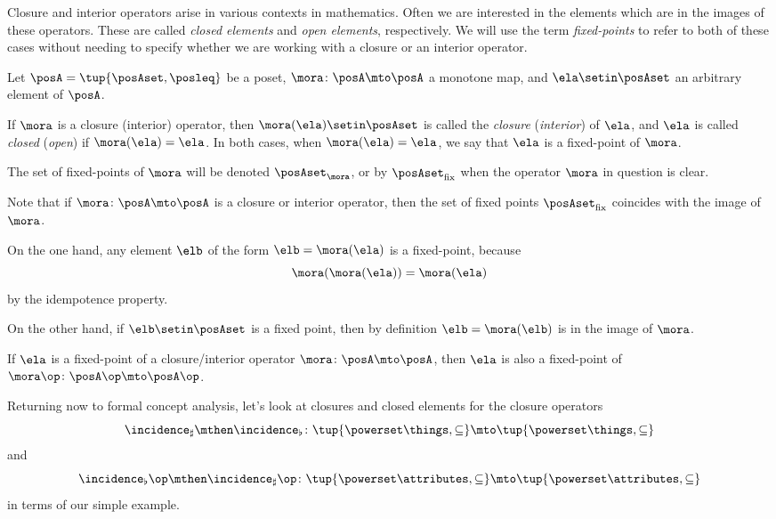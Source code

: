 Closure and interior operators arise in various contexts in mathematics.
Often we are interested in the elements which are in the images of these operators.
These are called \emph{closed elements} and \emph{open elements}, respectively.
We will use the term \emph{fixed-points} to refer to both of these cases without needing to specify whether we are working with a closure or an interior operator.

\begin{definition}\label{def:closure-closed-elements}
    Let $\posA = \tup{\posAset, \posleq}$ be a poset, $\mora \colon \posA \mto \posA$ a monotone map, and $\ela \setin \posAset$ an arbitrary element of $\posA$.

    If $\mora$ is a closure (interior) operator, then $\mora(\ela) \setin \posAset$ is called the \emph{closure} (\emph{interior}) of $\ela$, and $\ela$ is called \emph{closed} (\emph{open}) if $\mora(\ela) = \ela$.
    In both cases, when $\mora(\ela) = \ela$, we say that $\ela$ is a fixed-point of $\mora$.

    The set of fixed-points of $\mora$ will be denoted $\posAset_\mora$, or by $\posAset_{\text{fix}}$ when the operator $\mora$ in question is clear.
\end{definition}

\begin{remark}\label{rem:closed-elements-are-image}
    Note that if $\mora \colon \posA \mto \posA$ is a closure or interior operator, then the set of fixed points $\posAset_{\text{fix}}$ coincides with the image of $\mora$.

    On the one hand, any element $\elb$ of the form $\elb = \mora(\ela)$ is a fixed-point, because
    \begin{equation}
        \mora(\mora(\ela)) = \mora(\ela)
    \end{equation}
    by the idempotence property.

    On the other hand, if $\elb \setin \posAset$ is a fixed point, then by definition $\elb = \mora(\elb)$ is in the image of $\mora$.
\end{remark}

\begin{remark}\label{rem:fixed-points-coincide-closure-or-interior}
    If $\ela$ is a fixed-point of a closure/interior operator $\mora \colon \posA \mto \posA$, then $\ela$ is also a fixed-point of $\mora\op \colon \posA\op \mto \posA\op$.
\end{remark}

Returning now to formal concept analysis, let's look at closures and closed elements for the closure operators
$$\incidence_\sharp \mthen \incidence_\flat \colon \tup{\powerset \things, \subseteq} \mto \tup{\powerset \things, \subseteq}$$
and
$$\incidence_\flat\op \mthen \incidence_\sharp\op \colon \tup{\powerset \attributes, \subseteq} \mto \tup{\powerset \attributes, \subseteq} $$
in terms of our simple example.


